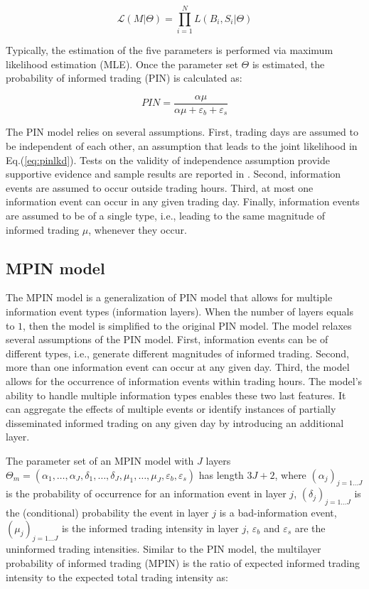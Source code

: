 \begin{equation}
\label{eq:pinlkd}
\mathcal{L}\left(M|\Theta\right) = \prod_{i = 1}^{N}L\left(B_{i}, S_{i}|\Theta\right) 
\end{equation}

Typically, the estimation of the five parameters is performed via maximum likelihood estimation (MLE). Once the parameter set \( \Theta\) is estimated, the probability of informed trading (PIN) is calculated as:

\begin{equation}
\label{eq:pinvalue}
PIN =\frac{\alpha \mu }{\alpha \mu +\varepsilon_{b}+\varepsilon_{s}}
\end{equation}

The PIN model relies on several assumptions. First, trading days are assumed to be independent of each other, an assumption that leads to the joint likelihood in Eq.(\ref{eq:pinlkd}). Tests on the validity of independence assumption provide supportive evidence and sample results are reported in \cite{Easley1997information}. Second, information events are assumed to occur outside trading hours. Third, at most one information event can occur in any given trading day. Finally, information events are assumed to be of a single type, i.e., leading to the same magnitude of informed trading \(\mu\), whenever they occur.

\subsection{MPIN model}

The MPIN model \citep{ersan2016multilayer} is a generalization of PIN model that allows for multiple information event types (information layers). When the number of layers  equals to \(1\), then the model is simplified to the original PIN model. The model  relaxes several assumptions of the PIN model. First, information events can be of different types, i.e., generate different magnitudes of informed trading. Second, more than one information event can occur at any given day. 
Third, the model allows for the occurrence of information events within trading hours.
The model's ability to handle multiple information types enables these two last features. It can aggregate the effects of multiple events or identify instances of partially disseminated informed trading on any given day by introducing an additional layer.

The parameter set of an MPIN model with $J$ layers \(\Theta_{m} =\left(\alpha_{1},\ldots ,\alpha_{J}, \delta_{1},\ldots ,\delta_{J},\mu_{1},\ldots ,\mu_{J},\varepsilon_{b},\varepsilon_{s}\right)\) has length \(3J+2\), where \((\alpha_{j})_{j = 1 \dots J}\) is the probability of occurrence for an information event in layer \(j\), \((\delta_{j})_{j=1 \dots J}\) is the (conditional) probability the event in layer \(j\) is a bad-information event, \((\mu_{j})_{j=1\ldots J}\)  is the informed trading intensity in layer \( j\), \(\varepsilon_{b}\) and \(\varepsilon_{s}\) are the uninformed trading intensities. Similar to the PIN model, the multilayer probability of informed trading (MPIN) is the ratio of expected informed trading intensity to the expected total trading intensity as:


